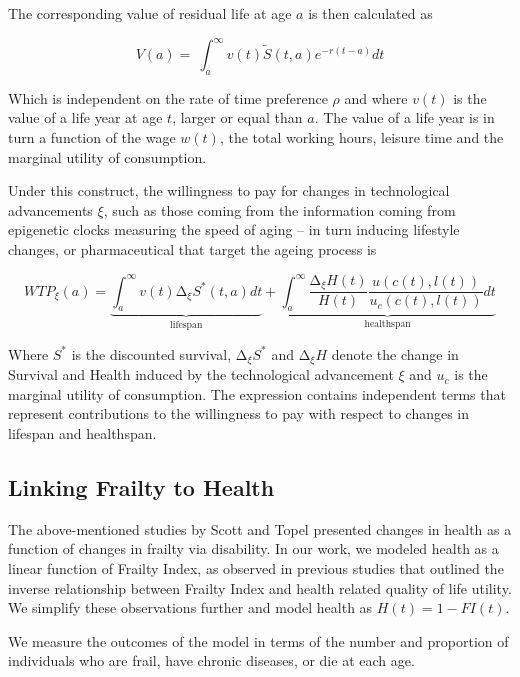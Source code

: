 The corresponding value of residual life at age $a$ is then calculated as

\begin{equation}\label{eq:residual_life}
V(a) = \ \int_{a}^{\infty}{v(t)}\widetilde{S}(t,a)e^{- r(t - a)}dt
\end{equation}

Which is independent on the rate of time preference $\rho$ and where $v(t)$ is the value of a life year at age $t$, larger or equal than $a$. The value of a life year is in turn a function of the wage $w(t)$, the total working hours, leisure time and the marginal utility of consumption\cite{Murphy2006,Scott2021}.

Under this construct, the willingness to pay for changes in technological advancements $\xi$, such as those coming from the information coming from epigenetic clocks measuring the speed of aging -- in turn inducing lifestyle changes, or pharmaceutical that target the ageing process is

\begin{equation}\label{eq:wtp}
{WTP}_{\xi}(a) = \underbrace{\int_{a}^{\infty}{v(t)}\mathrm{\Delta}_{\xi}S^{*}(t,a)dt}_{\text{lifespan}} + \underbrace{\int_{a}^{\infty}{\frac{\mathrm{\Delta}_{\xi}H(t)}{H(t)}\frac{u(c(t),l(t))}{u_{c}(c(t),l(t))}}dt}_{\text{healthspan}}
\end{equation}

Where $S^{*}$ is the discounted survival, $\mathrm{\Delta}_{\xi}S^{*}$ and $\mathrm{\Delta}_{\xi}H$ denote the change in Survival and Health induced by the technological advancement $\xi$ and $u_{c}$ is the marginal utility of consumption. The expression contains independent terms that represent contributions to the willingness to pay with respect to changes in lifespan and healthspan.

\subsection{Linking Frailty to Health}

The above-mentioned studies by Scott and Topel presented changes in health as a function of changes in frailty via disability. In our work, we modeled health as a linear function of Frailty Index, as observed in previous studies that outlined the inverse relationship between Frailty Index and health related quality of life utility\cite{Nathiya2023}. We simplify these observations further and model health as $H(t) = 1 - FI(t)$.

We measure the outcomes of the model in terms of the number and proportion of individuals who are frail, have chronic diseases, or die at each age.